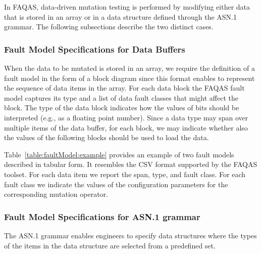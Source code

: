 In FAQAS, data-driven mutation testing is performed by modifying either data that is stored in an array or in a data structure defined through the ASN.1 grammar. The following subsections describe the two distinct cases.









\subsubsection{Fault Model Specifications for Data Buffers}

When the data to be mutated is stored in an array, we require the definition of a fault model in the form of a block diagram since this format enables to represent the sequence of data items in the array. 
For each data block the FAQAS fault model captures its type and a list of data fault classes that might affect the block. 
The type of the data block indicates how the values of bits should be interpreted (e.g., as a floating point number). Since a data type may span over multiple items of the data buffer, for each block, we may indicate whether also the values of the following blocks should be used to load the data.

Table~\ref{table:faultModel:example} provides an example of two fault models described in tabular form. 
It resembles the CSV format supported by the FAQAS toolset. For each data item we report the span, type, and fault class. For each fault class we indicate the values of the configuration parameters for the corresponding mutation operator.




\clearpage
\subsubsection{Fault Model Specifications for ASN.1 grammar}
\label{subsub:asn1model}

The ASN.1 grammar enables engineers to specify data structures where the types of the items in the data structure are selected from a predefined set.


